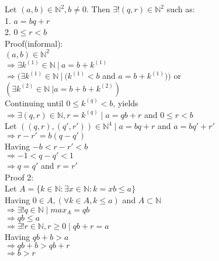 \documentclass{article}
\begin{document}
\noindent Let $(a,b) \in \mathbb{N}^2, b \neq 0.$
Then $\exists!(q,r) \in \mathbb{N}^2$ such as:\\
1. $ a = bq + r$\\
2. $ 0 \leq r < b$\\

\noindent Proof(informal):\\
$(a,b) \in \mathbb{N}^2$\\
$\Rightarrow \exists k^{(1)} \in \mathbb{N} \ | \ a = b + k^{(1)} $\\
$\Rightarrow ( \exists k^{(1)} \in \mathbb{N} \ | \ (k^{(1)} < b$ and $ a = b + k^{(1)})) $ or
$(\exists k^{(2)} \in \mathbb{N} \ |
 a = b + b + k^{(2)})$\\
Continuing until $0 \leq k^{(q)} < b $, yields\\
$\Rightarrow \exists (q,r) \in \mathbb{N}, r = k^{(q)}
\mid a = qb + r$ and $ 0 \leq r < b$\\

\noindent Let $((q,r),(q',r')) \in \mathbb{N}^4 \mid 
a = bq + r $ and $a = bq' + r'$\\
$\Rightarrow r - r' = b(q - q')$\\
Having $ -b <r - r' < b$\\
$\Rightarrow -1 < q-q' <1$\\
$\Rightarrow q = q' $ and $ r = r'$\\

\noindent Proof 2:\\
Let $A = \{k \in \mathbb{N}: \exists x \in \mathbb{N}:
k=xb \leq a\}$\\
Having $0 \in A, (\forall k \in A, k \leq a)$ and $A \subset \mathbb{N}$\\
$\Rightarrow \exists!q \in \mathbb{N} \mid max_A = qb$\\
$\Rightarrow qb \leq a$\\
$\Rightarrow \exists! r  \in \mathbb{N}, r \geq 0 \mid qb +r = a$\\
Having $qb + b > a$\\
$\Rightarrow qb + b > qb +r$\\
$\Rightarrow b > r$
\end{document}
